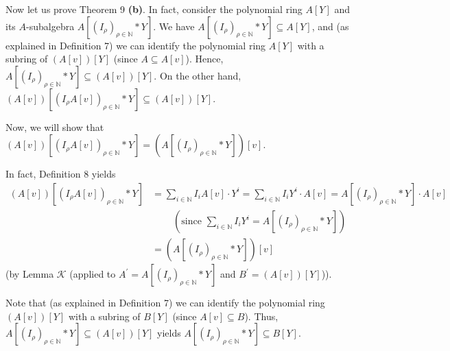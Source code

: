 \documentclass[12pt,final,notitlepage,onecolumn]{article}%
\begin{document}
Now let us prove Theorem 9 \textbf{(b)}. In fact, consider the polynomial ring
$A\left[  Y\right]  $ and its $A$-subalgebra $A\left[  \left(  I_{\rho
}\right)  _{\rho\in\mathbb{N}}\ast Y\right]  $. We have $A\left[  \left(
I_{\rho}\right)  _{\rho\in\mathbb{N}}\ast Y\right]  \subseteq A\left[
Y\right]  $, and (as explained in Definition 7) we can identify the polynomial
ring $A\left[  Y\right]  $ with a subring of $\left(  A\left[  v\right]
\right)  \left[  Y\right]  $ (since $A\subseteq A\left[  v\right]  $). Hence,
$A\left[  \left(  I_{\rho}\right)  _{\rho\in\mathbb{N}}\ast Y\right]
\subseteq\left(  A\left[  v\right]  \right)  \left[  Y\right]  $. On the other
hand, $\left(  A\left[  v\right]  \right)  \left[  \left(  I_{\rho}A\left[
v\right]  \right)  _{\rho\in\mathbb{N}}\ast Y\right]  \subseteq\left(
A\left[  v\right]  \right)  \left[  Y\right]  $.

Now, we will show that $\left(  A\left[  v\right]  \right)  \left[  \left(
I_{\rho}A\left[  v\right]  \right)  _{\rho\in\mathbb{N}}\ast Y\right]
=\left(  A\left[  \left(  I_{\rho}\right)  _{\rho\in\mathbb{N}}\ast Y\right]
\right)  \left[  v\right]  $.

In fact, Definition 8 yields%
\begin{align*}
\left(  A\left[  v\right]  \right)  \left[  \left(  I_{\rho}A\left[  v\right]
\right)  _{\rho\in\mathbb{N}}\ast Y\right]   &  =\sum\limits_{i\in\mathbb{N}%
}I_{i}A\left[  v\right]  \cdot Y^{i}=\sum\limits_{i\in\mathbb{N}}I_{i}%
Y^{i}\cdot A\left[  v\right]  =A\left[  \left(  I_{\rho}\right)  _{\rho
\in\mathbb{N}}\ast Y\right]  \cdot A\left[  v\right] \\
&  \ \ \ \ \ \ \ \ \ \ \left(  \text{since }\sum\limits_{i\in\mathbb{N}}%
I_{i}Y^{i}=A\left[  \left(  I_{\rho}\right)  _{\rho\in\mathbb{N}}\ast
Y\right]  \right) \\
&  =\left(  A\left[  \left(  I_{\rho}\right)  _{\rho\in\mathbb{N}}\ast
Y\right]  \right)  \left[  v\right]
\end{align*}
(by Lemma $\mathcal{K}$ (applied to $A^{\prime}=A\left[  \left(  I_{\rho
}\right)  _{\rho\in\mathbb{N}}\ast Y\right]  $ and $B^{\prime}=\left(
A\left[  v\right]  \right)  \left[  Y\right]  $)).

Note that (as explained in Definition 7) we can identify the polynomial ring
$\left(  A\left[  v\right]  \right)  \left[  Y\right]  $ with a subring of
$B\left[  Y\right]  $ (since $A\left[  v\right]  \subseteq B$). Thus,
$A\left[  \left(  I_{\rho}\right)  _{\rho\in\mathbb{N}}\ast Y\right]
\subseteq\left(  A\left[  v\right]  \right)  \left[  Y\right]  $ yields
$A\left[  \left(  I_{\rho}\right)  _{\rho\in\mathbb{N}}\ast Y\right]
\subseteq B\left[  Y\right]  $.
\end{document}
